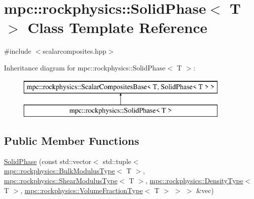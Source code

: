 \hypertarget{classmpc_1_1rockphysics_1_1_solid_phase}{}\section{mpc\+:\+:rockphysics\+:\+:Solid\+Phase$<$ T $>$ Class Template Reference}
\label{classmpc_1_1rockphysics_1_1_solid_phase}


{\ttfamily \#include $<$scalarcomposites.\+hpp$>$}

Inheritance diagram for mpc\+:\+:rockphysics\+:\+:Solid\+Phase$<$ T $>$\+:\begin{figure}[H]
\begin{center}
\leavevmode
\includegraphics[height=2.000000cm]{classmpc_1_1rockphysics_1_1_solid_phase}
\end{center}
\end{figure}
\subsection*{Public Member Functions}
\begin{DoxyCompactItemize}
\item 
\mbox{\hyperlink{classmpc_1_1rockphysics_1_1_solid_phase_ad44503640c956a6c89cb71678dacd6b1}{Solid\+Phase}} (const std\+::vector$<$ std\+::tuple$<$ \mbox{\hyperlink{structmpc_1_1rockphysics_1_1_bulk_modulus_type}{mpc\+::rockphysics\+::\+Bulk\+Modulus\+Type}}$<$ T $>$, \mbox{\hyperlink{structmpc_1_1rockphysics_1_1_shear_modulus_type}{mpc\+::rockphysics\+::\+Shear\+Modulus\+Type}}$<$ T $>$, \mbox{\hyperlink{structmpc_1_1rockphysics_1_1_density_type}{mpc\+::rockphysics\+::\+Density\+Type}}$<$ T $>$, \mbox{\hyperlink{structmpc_1_1rockphysics_1_1_volume_fraction_type}{mpc\+::rockphysics\+::\+Volume\+Fraction\+Type}}$<$ T $>$ $>$ $>$ \&vec)
\end{DoxyCompactItemize}
